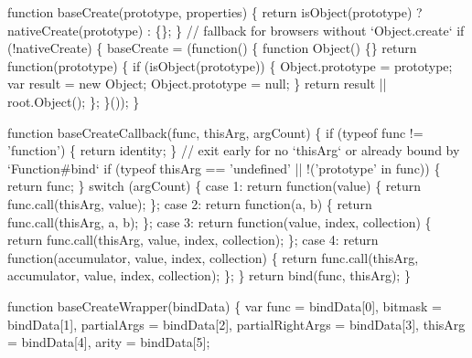 \begin{DoxyCodeInclude}
{{  \textcolor{keyword}{function} baseCreate(prototype, properties) \{
    \textcolor{keywordflow}{return} isObject(prototype) ? nativeCreate(prototype) : \{\};
  \}
  \textcolor{comment}{// fallback for browsers without `Object.create`}
  \textcolor{keywordflow}{if} (!nativeCreate) \{
    baseCreate = (\textcolor{keyword}{function}() \{
      \textcolor{keyword}{function} Object() \{\}
      \textcolor{keywordflow}{return} \textcolor{keyword}{function}(prototype) \{
        \textcolor{keywordflow}{if} (isObject(prototype)) \{
          Object.prototype = prototype;
          var result = \textcolor{keyword}{new} Object;
          Object.prototype = null;
        \}
        \textcolor{keywordflow}{return} result || root.Object();
      \};
    \}());
  \}

  \textcolor{keyword}{function} baseCreateCallback(func, thisArg, argCount) \{
    \textcolor{keywordflow}{if} (typeof func != \textcolor{stringliteral}{'function'}) \{
      \textcolor{keywordflow}{return} identity;
    \}
    \textcolor{comment}{// exit early for no `thisArg` or already bound by `Function#bind`}
    \textcolor{keywordflow}{if} (typeof thisArg == \textcolor{stringliteral}{'undefined'} || !(\textcolor{stringliteral}{'prototype'} in func)) \{
      \textcolor{keywordflow}{return} func;
    \}
    \textcolor{keywordflow}{switch} (argCount) \{
      \textcolor{keywordflow}{case} 1: \textcolor{keywordflow}{return} \textcolor{keyword}{function}(value) \{
        \textcolor{keywordflow}{return} func.call(thisArg, value);
      \};
      \textcolor{keywordflow}{case} 2: \textcolor{keywordflow}{return} \textcolor{keyword}{function}(a, b) \{
        \textcolor{keywordflow}{return} func.call(thisArg, a, b);
      \};
      \textcolor{keywordflow}{case} 3: \textcolor{keywordflow}{return} \textcolor{keyword}{function}(value, index, collection) \{
        \textcolor{keywordflow}{return} func.call(thisArg, value, index, collection);
      \};
      \textcolor{keywordflow}{case} 4: \textcolor{keywordflow}{return} \textcolor{keyword}{function}(accumulator, value, index, collection) \{
        \textcolor{keywordflow}{return} func.call(thisArg, accumulator, value, index, collection);
      \};
    \}
    \textcolor{keywordflow}{return} bind(func, thisArg);
  \}

  \textcolor{keyword}{function} baseCreateWrapper(bindData) \{
    var func = bindData[0],
        bitmask = bindData[1],
        partialArgs = bindData[2],
        partialRightArgs = bindData[3],
        thisArg = bindData[4],
        arity = bindData[5];

}}
\end{DoxyCodeInclude}
